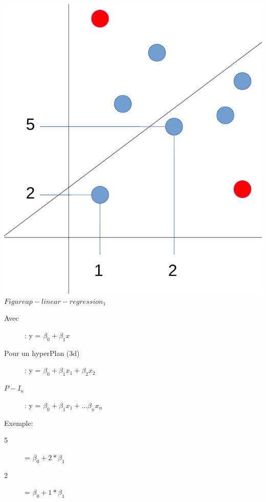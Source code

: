 \includegraphics[scale=0.3]{img/ap-linear-regression_1.png}
$Figure ap-linear-regression_1$

\begin{description}
\item[Avec]: y  = $\beta_0 + \beta_1 x$
\item[Pour un hyperPlan (3d)]: y = $\beta_0 + \beta_1 x_1 + \beta_2 x_2$
\item[$P-I_n$]: y = $\beta_0 + \beta_1 x_1 + ... \beta_n x_n$
\end{description}

Exemple:
\begin{description}
\item[5] =  $\beta_0 + 2 * \beta_1$
\item[2] =  $\beta_0 + 1 * \beta_1$
\end{description}

\pagebreak
